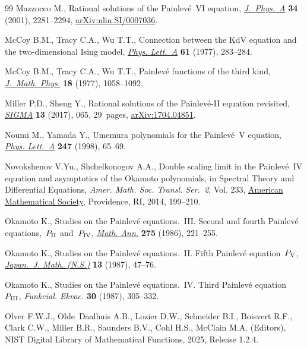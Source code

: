 \begin{thebibliography}{99}
Mazzocco M., Rational solutions of the {P}ainlev\'e~{VI} equation,
 \href{https://doi.org/10.1088/0305-4470/34/11/320}{\textit{J.~Phys.~A}}
 \textbf{34} (2001), 2281--2294,
 \href{http://arxiv.org/abs/nlin.SI/0007036}{arXiv:nlin.SI/0007036}.

McCoy B.M., Tracy C.A., Wu T.T., Connection between the {K}d{V} equation and
 the two-dimensional {I}sing model,
 \href{https://doi.org/10.1016/0375-9601(77)90613-2}{\textit{Phys. Lett.~A}}
 \textbf{61} (1977), 283--284.

McCoy B.M., Tracy C.A., Wu T.T., Painlev\'e functions of the third kind,
 \href{https://doi.org/10.1063/1.523367}{\textit{J.~Math. Phys.}} \textbf{18}
 (1977), 1058--1092.

Miller P.D., Sheng Y., Rational solutions of the {P}ainlev\'e-{II} equation
 revisited, \href{https://doi.org/10.3842/SIGMA.2017.065}{\textit{SIGMA}}
 \textbf{13} (2017), 065, 29~pages,
 \href{http://arxiv.org/abs/1704.04851}{arXiv:1704.04851}.

Noumi M., Yamada Y., Umemura polynomials for the {P}ainlev\'e~{V} equation,
 \href{https://doi.org/10.1016/S0375-9601(98)00625-2}{\textit{Phys. Lett.~A}}
 \textbf{247} (1998), 65--69.

Novokshenov V.Yu., Shchelkonogov A.A., Double scaling limit in the
 {P}ainlev\'e~{IV} equation and asymptotics of the {O}kamoto polynomials, in
 Spectral {T}heory and {D}ifferential {E}quations, \textit{Amer. Math. Soc.
 Transl. Ser.~2}, Vol. 233,
 \href{https://doi.org/10.1090/trans2/233/12}{American Mathematical Society},
 Providence, RI, 2014, 199--210.

Okamoto K., Studies on the {P}ainlev\'e equations.~{III}. {S}econd and fourth
 {P}ainlev\'e equations,~{$P_{{\rm II}}$} and~{$P_{{\rm IV}}$},
 \href{https://doi.org/10.1007/BF01458459}{\textit{Math. Ann.}} \textbf{275}
 (1986), 221--255.

Okamoto K., Studies on the {P}ainlev\'e equations.~{II}. {F}ifth {P}ainlev\'e
 equation~{$P_{\rm V}$},
 \href{https://doi.org/10.4099/math1924.13.47}{\textit{Japan.~J. Math.
 (N.S.)}} \textbf{13} (1987), 47--76.

Okamoto K., Studies on the {P}ainlev\'e equations.~{IV}. {T}hird {P}ainlev\'e
 equation~{$P_{{\rm III}}$}, \textit{Funkcial. Ekvac.} \textbf{30} (1987),
 305--332.

Olver F.W.J., Olde~Daalhuis A.B., Lozier D.W., Schneider B.I., Boisvert R.F.,
 Clark C.W., Miller B.R., Saunders B.V., Cohl H.S., McClain M.A. (Editors),
 NIST Digital Library of Mathematical Functions, 2025, Release 1.2.4.


\end{thebibliography}
